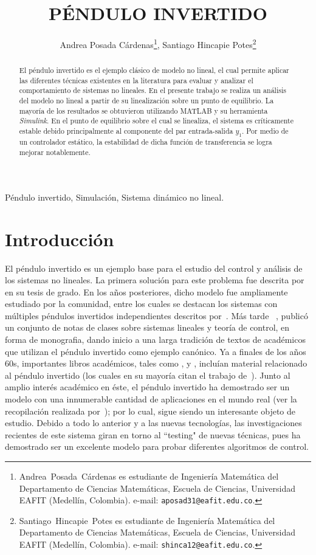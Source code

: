 \documentclass[journal]{IEEEtran}
\title{PÉNDULO INVERTIDO}
\author{Andrea Posada Cárdenas\thanks{Andrea~Posada~Cárdenas es estudiante de Ingeniería Matemática del Departamento de Ciencias Matemáticas, Escuela de Ciencias, Universidad EAFIT (Medellín,  Colombia). e-mail: \texttt{aposad31@eafit.edu.co}.},
  Santiago Hincapie Potes\thanks{Santiago~Hincapie~Potes es estudiante de Ingeniería Matemática del Departamento de Ciencias Matemáticas, Escuela de Ciencias, Universidad EAFIT (Medellín,  Colombia). e-mail: \texttt{shinca12@eafit.edu.co}.}}
\begin{document}
\maketitle
\begin{IEEEkeywords}
  Péndulo invertido, Simulación, Sistema dinámico no lineal.
\end{IEEEkeywords}

\begin{abstract}
El péndulo invertido es el ejemplo clásico de modelo no lineal, el cual permite aplicar las diferentes técnicas existentes en la literatura para evaluar y analizar el comportamiento de sistemas no lineales. En el presente trabajo se realiza un análisis del modelo no lineal a partir de su linealización sobre un punto de equilibrio. La mayoría de los resultados se obtuvieron utilizando MATLAB y su herramienta \textit{Simulink}. En el punto de equilibrio sobre el cual se linealiza, el sistema es críticamente estable debido principalmente al componente del par entrada-salida $y_1$. Por medio de un controlador estático, la estabilidad de dicha función de transferencia se logra mejorar notablemente.
\end{abstract}

\section{Introducción}\label{sec:introduction}

El péndulo invertido es un ejemplo base para el estudio
del control y análisis de los sistemas no lineales. 
La primera solución para este problema fue descrita por~\cite{Roberge} en su tesis de grado. En los años posteriores, dicho modelo fue ampliamente estudiado por la comunidad, entre los cuales se destacan los sistemas con múltiples péndulos invertidos independientes descritos por~\cite{Higdon63}. Más tarde ~\cite{truxal65}, publicó un conjunto de notas de clases sobre sistemas lineales y teoría de control, en forma de monografia, dando inicio a una larga tradición de textos de académicos que utilizan el péndulo invertido como ejemplo canónico. Ya a finales de los años 60s, importantes libros académicos, tales como \cite{cannon67}, \cite{dorf67} y \cite{ogata70}, incluían material relacionado al péndulo invertido (los cuales en su mayoría citan el trabajo de~\cite{Higdon63}).
Junto al amplio interés académico en éste, el péndulo invertido ha demostrado ser un modelo con una innumerable cantidad de aplicaciones en el mundo real (ver la recopilación realizada por~\cite{Kafetzis:288541}); por lo cual, sigue siendo un interesante objeto de estudio.
Debido a todo lo anterior y a las nuevas tecnologías, las investigaciones recientes de este sistema giran en torno al ``testing" de nuevas técnicas, pues ha demostrado ser un excelente modelo para probar diferentes algoritmos de control\cite{Boubaker2017}.\\
\end{document}
